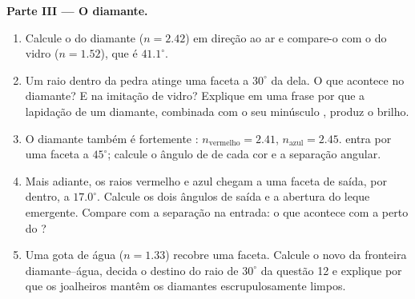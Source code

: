\begin{problem}
\medskip
\noindent\textbf{Parte III --- O diamante.}
\begin{enumerate}[resume]
  \item Calcule o  do diamante ($n = 2.42$) em direção ao ar
        e compare-o com o do vidro ($n = 1.52$), que é $41.1^\circ$.
  \item Um raio dentro da pedra atinge uma faceta a $30^\circ$ da 
        dela. O que acontece no diamante? E na imitação de vidro?
        Explique em uma frase por que a lapidação de um diamante,
        combinada com o seu minúsculo , produz o brilho.
  \item O diamante também é fortemente :
        $n_{\text{vermelho}} = 2.41$, $n_{\text{azul}} = 2.45$.  entra por uma faceta a $45^\circ$; calcule o ângulo de
         de cada cor e a separação angular.
  \item Mais adiante, os raios vermelho e azul chegam a uma faceta de
        saída, por dentro, a $17.0^\circ$. Calcule os dois ângulos de
        saída e a abertura do leque emergente. Compare com a separação na
        entrada: o que acontece com a  perto do ?
  \item Uma gota de água ($n = 1.33$) recobre uma faceta. Calcule o novo
         da fronteira diamante--água, decida o destino do
        raio de $30^\circ$ da questão 12 e explique por que os joalheiros
        mantêm os diamantes escrupulosamente limpos.
\end{enumerate}


\end{problem}
